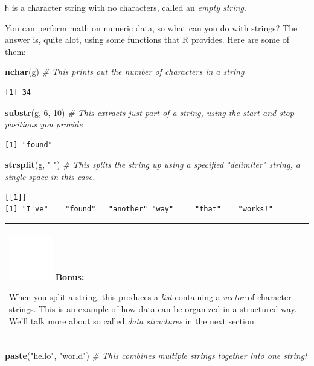 \documentclass[
]{book}
\newenvironment{Shaded}{\begin{snugshade}}{\end{snugshade}}
\newcommand{\CommentTok}[1]{\textcolor[rgb]{0.56,0.35,0.01}{\textit{#1}}}
\newcommand{\DecValTok}[1]{\textcolor[rgb]{0.00,0.00,0.81}{#1}}
\newcommand{\KeywordTok}[1]{\textcolor[rgb]{0.13,0.29,0.53}{\textbf{#1}}}
\newcommand{\NormalTok}[1]{#1}
\newcommand{\StringTok}[1]{\textcolor[rgb]{0.31,0.60,0.02}{#1}}
\newenvironment{bonus}
{
  \begin{center}
  \begin{tabular}{|>{\columncolor{bonus}\color{white}}p{0.9\textwidth}|}\hline\\
  \includegraphics[scale=0.1]{src/images/sun-fill-invert.png}
  \textbf{Bonus:}
}
{\\\\\hline
  \end{tabular}
  \end{center}
}
\begin{document}
\texttt{h} is a character string with no characters, called an \emph{empty string}.

You can perform math on numeric data, so what can you do with strings?
The answer is, quite alot, using some functions that R provides.
Here are some of them:

\begin{Shaded}
\begin{Highlighting}[]
\KeywordTok{nchar}\NormalTok{(g)   }\CommentTok{# This prints out the number of characters in a string}
\end{Highlighting}
\end{Shaded}

\begin{verbatim}
[1] 34
\end{verbatim}

\begin{Shaded}
\begin{Highlighting}[]
\KeywordTok{substr}\NormalTok{(g, }\DecValTok{6}\NormalTok{, }\DecValTok{10}\NormalTok{)   }\CommentTok{# This extracts just part of a string, using the start and stop positions you provide}
\end{Highlighting}
\end{Shaded}

\begin{verbatim}
[1] "found"
\end{verbatim}

\begin{Shaded}
\begin{Highlighting}[]
\KeywordTok{strsplit}\NormalTok{(g, }\StringTok{" "}\NormalTok{)   }\CommentTok{# This splits the string up using a specified "delimiter" string, a single space in this case. }
\end{Highlighting}
\end{Shaded}

\begin{verbatim}
[[1]]
[1] "I've"    "found"   "another" "way"     "that"    "works!" 
\end{verbatim}

\begin{bonus}
When you split a string, this produces a \emph{list} containing a
\emph{vector} of character strings. This is an example of how data can
be organized in a structured way. We'll talk more about so called
\emph{data structures} in the next section.
\end{bonus}

\begin{Shaded}
\begin{Highlighting}[]
\KeywordTok{paste}\NormalTok{(}\StringTok{"hello"}\NormalTok{, }\StringTok{"world"}\NormalTok{)   }\CommentTok{# This combines multiple strings together into one string!}
\end{Highlighting}
\end{Shaded}
\end{document}
